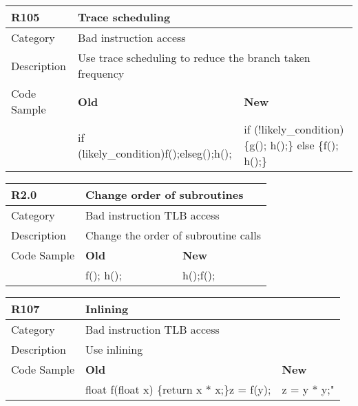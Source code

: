 \begin{tabular}{|p{0.9in}|p{2.0in}|p{2.0in}|} \hline
\textbf{R105}       & \multicolumn{2}{|p{4.0in}|}{\textbf{Trace scheduling}} \\ \hline
Category            & \multicolumn{2}{|p{4.0in}|}{Bad instruction access} \\ \hline
Description         & \multicolumn{2}{|p{4.0in}|}{Use trace scheduling to reduce the branch taken frequency} \\ \hline
Code Sample         & \textbf{Old} & \textbf{New} \\ \hline
                    & if (likely\_condition)\newline   f();\newline else\newline   g();\newline h();
                    & if (!likely\_condition) \{\newline   g(); h();\newline \} else \{\newline   f(); h();\newline \} \\ \hline
\end{tabular}

\begin{tabular}{|p{0.9in}|p{2.0in}|p{2.0in}|} \hline
\textbf{R2.0}       & \multicolumn{2}{|p{4.0in}|}{\textbf{Change order of subroutines}} \\ \hline
Category            & \multicolumn{2}{|p{4.0in}|}{Bad instruction TLB access} \\ \hline
Description         & \multicolumn{2}{|p{4.0in}|}{Change the order of subroutine calls} \\ \hline
Code Sample         & \textbf{Old} & \textbf{New} \\ \hline
                    & f(); \newline h();
                    & h();\newline f(); \\ \hline
\end{tabular}

\begin{tabular}{|p{0.9in}|p{2.0in}|p{2.0in}|} \hline
\textbf{R107}       & \multicolumn{2}{|p{4.0in}|}{\textbf{Inlining}} \\ \hline
Category            & \multicolumn{2}{|p{4.0in}|}{Bad instruction TLB access} \\ \hline
Description         & \multicolumn{2}{|p{4.0in}|}{Use inlining } \\ \hline
Code Sample         & \textbf{Old} & \textbf{New} \\ \hline
                    & float f(float x) \{\newline   return x * x;\newline \}\newline z = f(y);
                    & z = y * y;" \\ \hline
\end{tabular}

